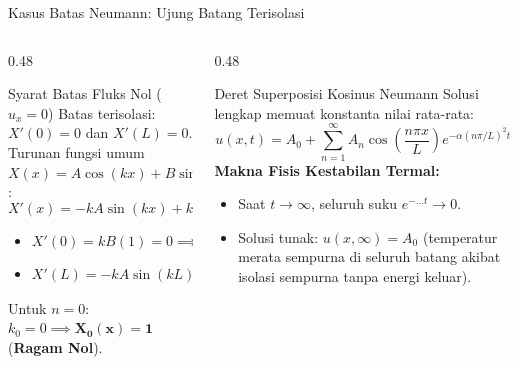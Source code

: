 \documentclass[aspectratio=169,10pt]{beamer}
\begin{document}
\begin{frame}{Kasus Batas Neumann: Ujung Batang Terisolasi}
  \begin{columns}[t]
    \begin{column}{0.48\textwidth}
      \begin{block}{Syarat Batas Fluks Nol ($u_x = 0$)}
        \small
        Batas terisolasi: $X'(0) = 0$ dan $X'(L) = 0$.\\
        Turunan fungsi umum $X(x) = A\cos(kx) + B\sin(kx)$:
        \begin{equation*}
          X'(x) = -k A \sin(kx) + k B \cos(kx)
        \end{equation*}
        \begin{itemize}
          \item $X'(0) = k B (1) = 0 \implies \mathbf{B = 0}$
          \item $X'(L) = -k A \sin(kL) = 0 \implies \mathbf{k_n = \frac{n\pi}{L}}$
        \end{itemize}
        Untuk $n = 0$: $k_0 = 0 \implies \mathbf{X_0(x) = 1}$ (\textbf{Ragam Nol}).
      \end{block}
    \end{column}
    \begin{column}{0.48\textwidth}
      \begin{alertblock}{Deret Superposisi Kosinus Neumann}
        \small
        Solusi lengkap memuat konstanta nilai rata-rata:
        \begin{equation*}
          u(x, t) = A_0 + \sum_{n=1}^{\infty} A_n \cos\left(\frac{n\pi x}{L}\right) e^{-\alpha (n\pi/L)^2 t}
        \end{equation*}
        \textbf{Makna Fisis Kestabilan Termal:}
        \begin{itemize}
          \item Saat $t \to \infty$, seluruh suku $e^{-\dots t} \to 0$.
          \item Solusi tunak: $u(x, \infty) = A_0$ (temperatur merata sempurna di seluruh batang akibat isolasi sempurna tanpa energi keluar).
        \end{itemize}
      \end{alertblock}
    \end{column}
  \end{columns}
\end{frame}
\end{document}
